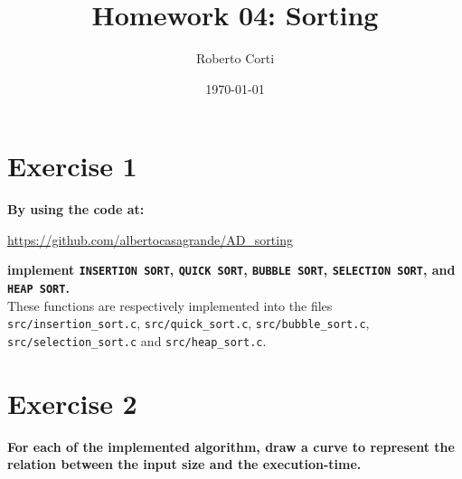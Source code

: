 \documentclass{article}
\title{Homework 04: Sorting}
\date{\today}
\author{Roberto Corti}
\begin{document}
	\maketitle
	\section*{Exercise 1}
	\textbf{By using the code at:}
		\begin{center}
			\url{https://github.com/albertocasagrande/AD_sorting}
		\end{center}
	\textbf{implement \texttt{INSERTION SORT}, \texttt{QUICK SORT}, \texttt{BUBBLE SORT}, \texttt{SELECTION SORT}, and \texttt{HEAP SORT}.} \\
	
	\noindent These functions are respectively implemented into the files \texttt{src/insertion\_sort.c}, \texttt{src/quick\_sort.c}, \texttt{src/bubble\_sort.c}, \texttt{src/selection\_sort.c} and  \texttt{src/heap\_sort.c}. 
	
	\section*{Exercise 2}
	\textbf{For each of the implemented algorithm, draw a curve to represent the relation between the input size and the execution-time.} \\
	
\end{document}
